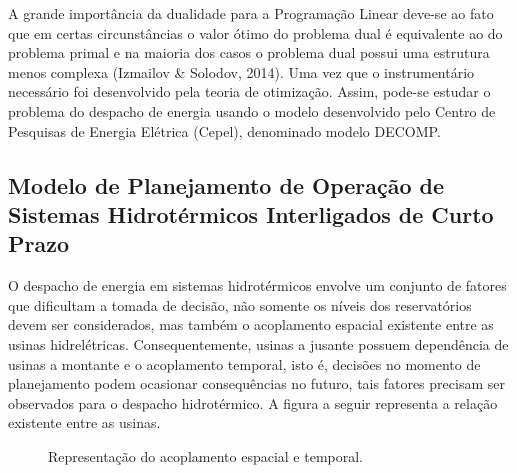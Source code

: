 \documentclass[12pt,fleqn]{article}
\begin{document}
A grande import\^ancia da dualidade para a Programa\c c\~ao Linear deve-se ao fato que em certas circunst\^ancias o valor \'otimo do problema dual \'e equivalente ao do
problema primal e na maioria dos casos o problema dual possui uma estrutura menos complexa (Izmailov \& Solodov, 2014). Uma
vez que o instrument\'ario necess\'ario foi desenvolvido pela teoria de otimiza\c c\~ao. Assim, pode-se estudar o problema do despacho de
energia usando o modelo desenvolvido pelo Centro de Pesquisas de Energia El\'etrica (Cepel), denominado modelo DECOMP. 

\subsection{Modelo de Planejamento de Opera\c c\~ao de Sistemas Hidrot\'ermicos Interligados de Curto Prazo}
O despacho de energia em sistemas hidrot\'ermicos envolve um conjunto de fatores que dificultam a tomada de decis\~ao, 
n\~ao somente os n\'iveis dos reservat\'orios devem ser considerados, mas tamb\'em o acoplamento espacial existente entre as usinas
hidrel\'etricas. Consequentemente, usinas a jusante possuem depend\^encia de usinas a montante e o acoplamento temporal, isto
\'e,
decis\~oes no momento de planejamento podem ocasionar consequ\^encias no futuro, tais fatores  precisam ser observados para
o despacho hidrot\'ermico. A figura a seguir representa a rela\c c\~ao existente entre as usinas. 
\begin{figure}[!htpb]
  \centering
  \resizebox{0.4\textwidth}{!}{%
  }
  \caption{Representa\c c\~ao do acoplamento espacial e temporal.}
\end{figure}
\end{document}
